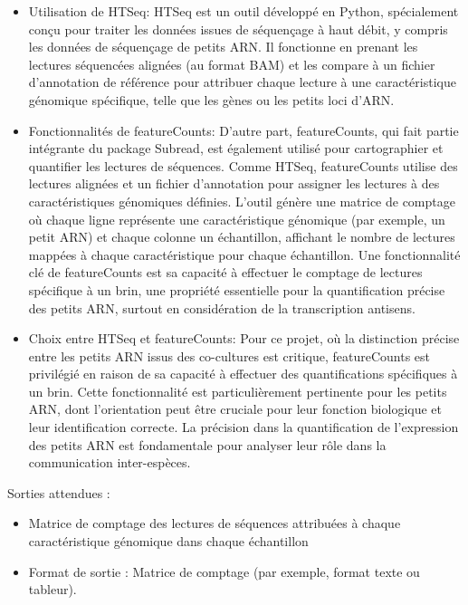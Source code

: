 \documentclass{report}
\begin{document}
\begin{itemize}
    \item Utilisation de HTSeq:
    HTSeq est un outil développé en Python, spécialement conçu pour traiter les données issues de séquençage à haut débit, y compris les données de séquençage de petits ARN. Il fonctionne en prenant les lectures séquencées alignées (au format BAM) et les compare à un fichier d'annotation de référence pour attribuer chaque lecture à une caractéristique génomique spécifique, telle que les gènes ou les petits loci d'ARN.
    \item Fonctionnalités de featureCounts:
    D'autre part, featureCounts, qui fait partie intégrante du package Subread, est également utilisé pour cartographier et quantifier les lectures de séquences. Comme HTSeq, featureCounts utilise des lectures alignées et un fichier d'annotation pour assigner les lectures à des caractéristiques génomiques définies. L'outil génère une matrice de comptage où chaque ligne représente une caractéristique génomique (par exemple, un petit ARN) et chaque colonne un échantillon, affichant le nombre de lectures mappées à chaque caractéristique pour chaque échantillon. Une fonctionnalité clé de featureCounts est sa capacité à effectuer le comptage de lectures spécifique à un brin, une propriété essentielle pour la quantification précise des petits ARN, surtout en considération de la transcription antisens.
    \item Choix entre HTSeq et featureCounts:
    Pour ce projet, où la distinction précise entre les petits ARN issus des co-cultures est critique, featureCounts est privilégié en raison de sa capacité à effectuer des quantifications spécifiques à un brin. Cette fonctionnalité est particulièrement pertinente pour les petits ARN, dont l'orientation peut être cruciale pour leur fonction biologique et leur identification correcte. La précision dans la quantification de l'expression des petits ARN est fondamentale pour analyser leur rôle dans la communication inter-espèces.
\end{itemize} \vspace{.5cm}

\noindent Sorties attendues :
\begin{itemize}
    \item Matrice de comptage des lectures de séquences attribuées à chaque caractéristique génomique dans chaque échantillon
    \item Format de sortie : Matrice de comptage (par exemple, format texte ou tableur).
\end{itemize}
\end{document}
